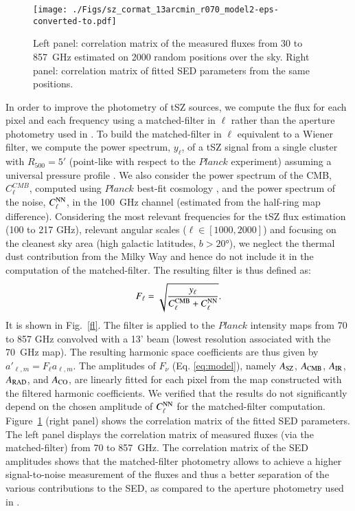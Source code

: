 \documentclass[traditabstract,a4,twocolumn]{aa}
\begin{document}
\begin{figure}[!th]
\center
\texttt{[image: ./Figs/sz\_cormat\_13arcmin\_r070\_model2-eps-converted-to.pdf]}
\caption{Left panel: correlation matrix of the measured fluxes from
  30 to 857~GHz estimated on 2000 random positions over the sky. Right
  panel: correlation matrix of fitted SED parameters from the same
  positions.}
\label{cormat}
\end{figure}

In order to improve the photometry of tSZ sources, we compute the flux for each pixel and each frequency using a matched-filter in $\ell$ rather than the aperture photometry used in \citet{agh14}. To build the matched-filter in $\ell$ equivalent to a  Wiener filter, we compute the power spectrum, $y_\ell$, of a tSZ signal from a single cluster with $R_{500} = 5'$ (point-like with respect to the $Planck$ experiment) assuming a universal pressure profile \citep{arn10}. We also consider the power spectrum of the CMB, $C^{CMB}_\ell$, computed using $Planck$ best-fit cosmology \citep{planck2015cosmo}, and the power spectrum of the noise, $C_\ell^{\rm NN}$, in the 100~GHz channel (estimated from the half-ring map difference). Considering the most relevant frequencies for the tSZ flux estimation (100 to 217 GHz), relevant angular scales ($\ell \in [1000,2000]$) and focusing on the cleanest sky area (high galactic latitudes, $b > 20°$), we neglect the thermal dust contribution from the Milky Way and hence do not include it in the computation of the matched-filter. The resulting filter is thus defined as:
\begin{align}
F_\ell = \sqrt{\frac{y_\ell}{C^{\rm CMB}_\ell + C_\ell^{\rm NN}}}.
\end{align}
It is shown in Fig.~\ref{fl}. The filter is applied to the $Planck$ intensity maps from 70 to 857 GHz convolved with a 13' beam (lowest resolution associated with the 70~GHz map). The resulting harmonic space coefficients are thus given by $a'_{\ell, m} = F_\ell a_{\ell, m}$. The amplitudes of $F_\nu$ (Eq. \ref{eq:model}), namely $A_{\rm SZ}$, $A_{\rm CMB}$,
$A_{\rm IR}$, $A_{\rm RAD}$, and $A_{\rm CO}$, are linearly fitted for each pixel from the map constructed with the filtered harmonic coefficients. We verified that the results do not significantly depend on the chosen amplitude of $C_\ell^{\rm NN}$ for the matched-filter computation. Figure~\ref{cormat} (right panel) shows the correlation matrix of the fitted SED parameters. The left panel displays the correlation matrix of measured fluxes (via the matched-filter) from 70 to 857~GHz. The correlation matrix of the SED amplitudes shows that the matched-filter photometry allows to achieve a higher signal-to-noise measurement of the fluxes and thus a better separation of the various contributions to the SED, as compared to the aperture photometry used in \citet{agh14}.
\end{document}
